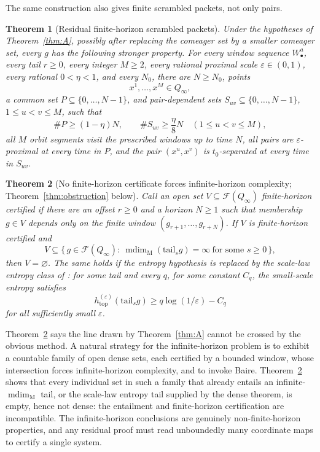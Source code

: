 \documentclass[11pt]{article}
\newtheorem{theorem}{Theorem}[section]
\newcommand{\Q}{Q_\infty}
\newcommand{\F}{\mathcal{F}}
\newcommand{\mdim}{\operatorname{mdim}_{\mathrm M}}
\begin{document}
The same construction also gives finite scrambled packets, not only pairs.

\begin{theorem}[Residual finite-horizon scrambled packets]\label{thm:packet-intro}
Under the hypotheses of Theorem~\ref{thm:A}, possibly after replacing the comeager set
by a smaller comeager set, every \(g\) has the following stronger property.  For every
window sequence \(W^a_\bullet\), every tail \(r\ge0\), every integer \(M\ge2\), every
rational proximal scale \(\varepsilon\in(0,1)\), every rational \(0<\eta<1\), and every
\(N_0\), there are \(N\ge N_0\), points
\[
  x^1,\ldots,x^M\in\Q,
\]
a common set \(P\subseteq\{0,\ldots,N-1\}\), and pair-dependent sets
\(S_{uv}\subseteq\{0,\ldots,N-1\}\), \(1\le u<v\le M\), such that
\[
  \#P\ge(1-\eta)N,\qquad
  \#S_{uv}\ge \frac{\eta}{8}N\quad(1\le u<v\le M),
\]
all \(M\) orbit segments visit the prescribed windows up to time \(N\), all pairs are
\(\varepsilon\)-proximal at every time in \(P\), and the pair \((x^u,x^v)\) is
\(t_0\)-separated at every time in \(S_{uv}\).
\end{theorem}

\begin{theorem}[No finite-horizon certificate forces infinite-horizon complexity;
Theorem~\ref{thm:obstruction} below]\label{thm:B}
Call an open set $V\subseteq\F(\Q)$ \emph{finite-horizon certified} if there are an
offset $r\ge0$ and a horizon $N\ge1$ such that membership $g\in V$ depends only on the
finite window $(g_{r+1},\dots,g_{r+N})$.  If $V$ is finite-horizon certified and
\[
V\subseteq\bigl\{\,g\in\F(\Q):\ \mdim(\mathrm{tail}_s g)=\infty
\ \text{for some }s\ge0\,\bigr\},
\]
then $V=\varnothing$.  The same holds if the entropy hypothesis is replaced by the
scale-law entropy class of \cite{Shmalo2026}: for some tail and every \(q\), for some
constant \(C_q\), the
small-scale entropy satisfies
\[
h^{(\varepsilon)}_{\mathrm{top}}(\mathrm{tail}_s g)
\ge q\log(1/\varepsilon)-C_q
\]
for all sufficiently small \(\varepsilon\).
\end{theorem}

Theorem~\ref{thm:B} says the line drawn by Theorem~\ref{thm:A} cannot be crossed by the
obvious method.  A natural strategy for the infinite-horizon problem is to exhibit a
countable family of open dense sets, each certified by a bounded window, whose
intersection forces infinite-horizon complexity, and to invoke Baire.  Theorem~\ref{thm:B}
shows that every individual set in such a family that already entails an
infinite-\(\mdim\) tail, or the scale-law entropy tail supplied by the dense theorem, is
empty, hence not dense: the entailment and finite-horizon certification are
incompatible.  The infinite-horizon conclusions are genuinely
non-finite-horizon properties, and any residual proof must read unboundedly many
coordinate maps to certify a single system.
\end{document}
